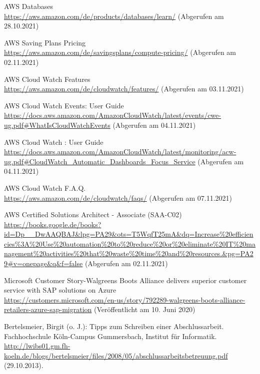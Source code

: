 \begin{thebibliography}{HR08}
   AWS Databases\\
  \url{https://aws.amazon.com/de/products/databases/learn/}
  (Abgerufen am 28.10.2021)

   AWS Saving Plans Pricing\\
  \url{https://aws.amazon.com/de/savingsplans/compute-pricing/}
  (Abgerufen am 02.11.2021)

   AWS Cloud Watch Features\\
  \url{https://aws.amazon.com/de/cloudwatch/features/}
  (Abgerufen am 03.11.2021)


   AWS Cloud Watch Events: User Guide\\
  \url{https://docs.aws.amazon.com/AmazonCloudWatch/latest/events/cwe-ug.pdf#WhatIsCloudWatchEvents}
  (Abgerufen am 04.11.2021)

 AWS Cloud Watch : User Guide\\
  \url{https://docs.aws.amazon.com/AmazonCloudWatch/latest/monitoring/acw-ug.pdf#CloudWatch_Automatic_Dashboards_Focus_Service}
  (Abgerufen am 04.11.2021)

 AWS Cloud Watch F.A.Q.\\
  \url{https://aws.amazon.com/de/cloudwatch/faqs/}
  (Abgerufen am 07.11.2021)




  
 AWS Certified Solutions Architect - Associate (SAA-C02)\\
  \url{https://books.google.de/books?id=Dp__DwAAQBAJ&lpg=PA29&ots=T5WqfT25mA&dq=Increase%20efficiencies%3A%20Use%20automation%20to%20reduce%20or%20eliminate%20IT%20management%20activities%20that%20waste%20time%20and%20resources.&pg=PA29#v=onepage&q&f=false}
  (Abgerufen am 02.11.2021)
  
   Microsoft Customer Story-Walgreens Boots Alliance delivers superior customer service with SAP solutions on Azure \\
  \url{https://customers.microsoft.com/en-us/story/792289-walgreens-boots-alliance-retailers-azure-sap-migration}
  (Veröffentlicht am 10. Juni 2020)

  Bertelsmeier, Birgit (o. J.): Tipps zum Schrei\-b\-en ei\-n\-er Ab\-sch\-luss\-ar\-beit. Fach\-hoch\-schu\-le Köln-Campus Gummersbach, Institut für Informatik. \\
  \url{http://lwibs01.gm.fh-koeln.de/blogs/bertelsmeier/files/2008/05/abschlussarbeitsbetreuung.pdf} (29.10.2013).


\end{thebibliography}
